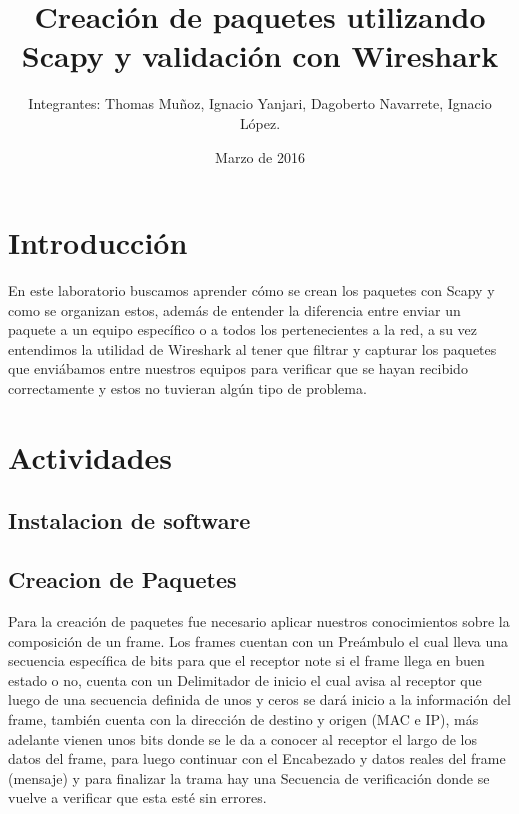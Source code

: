 \documentclass{udpreport}
\title{Creación de paquetes utilizando Scapy y validación con Wireshark}
\author{Integrantes: Thomas Muñoz, Ignacio Yanjari, Dagoberto Navarrete, Ignacio López.}
\date{Marzo de 2016}
\begin{document}
\maketitle
\tableofcontents
\chapter{Introducción}
	En este laboratorio buscamos aprender cómo se crean los paquetes con Scapy y como se organizan estos, además de entender la
	diferencia entre enviar un paquete a un equipo específico o a todos los pertenecientes a la red, a su vez entendimos la
	utilidad de Wireshark al tener que filtrar y capturar los paquetes que enviábamos entre nuestros equipos para verificar que se
	hayan recibido correctamente y estos no tuvieran algún tipo de problema.
\chapter{Actividades}
	\section{Instalacion de software}

	\section{Creacion de Paquetes}
		Para la creación de paquetes fue necesario aplicar nuestros conocimientos sobre la composición de un frame.
		Los frames cuentan con un Preámbulo el cual lleva una secuencia específica de bits para que el receptor note si el
		frame llega en buen estado o no, cuenta con un Delimitador de inicio el cual avisa al receptor que luego de una
		secuencia definida de unos y ceros se dará inicio a la información del frame, también cuenta con la dirección de
		destino y origen (MAC e IP), más adelante vienen unos bits donde se le da a conocer al receptor el largo de los datos
		del frame, para luego continuar con el Encabezado y datos reales del frame (mensaje) y para finalizar la trama hay una
		Secuencia de verificación donde se vuelve a verificar que esta esté sin errores.\\
		
\end{document}
